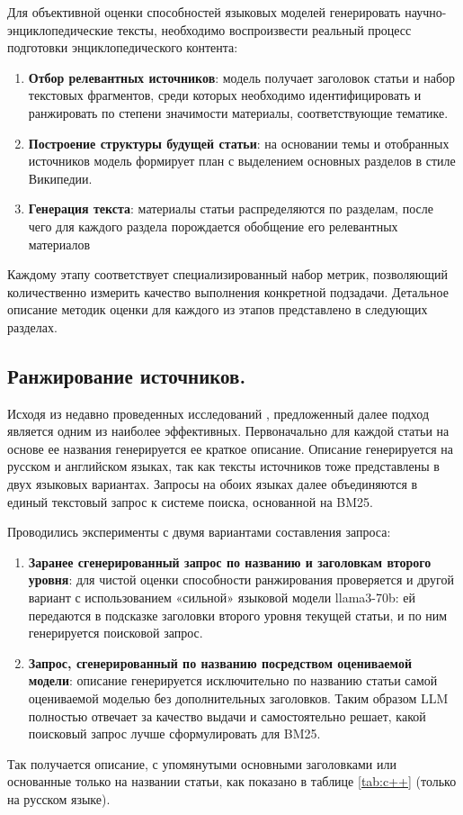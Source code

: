 \documentclass{article}
\theoremstyle{definition}
\theoremstyle{plain}
\begin{document}
Для объективной оценки способностей языковых моделей генерировать научно-энциклопедические тексты, необходимо воспроизвести реальный процесс подготовки энциклопедического контента:
\begin{enumerate}

    \item \textbf{Отбор релевантных источников}: модель получает заголовок статьи и набор текстовых фрагментов, среди которых необходимо идентифицировать и ранжировать по степени значимости материалы, соответствующие тематике. 
    
    \item \textbf{Построение структуры будущей статьи}: на основании темы и отобранных источников модель формирует план с выделением основных разделов в стиле Википедии.
    
    \item \textbf{Генерация текста}: материалы статьи распределяются по разделам, после чего для каждого раздела порождается обобщение его релевантных материалов

\end{enumerate}
Каждому этапу соответствует специализированный набор метрик, позволяющий количественно измерить качество выполнения конкретной подзадачи. 
Детальное описание методик оценки для каждого из этапов представлено в следующих разделах.
\subsection*{Ранжирование источников.}
Исходя из недавно проведенных исследований \cite{rerank}, предложенный далее подход является одним из наиболее эффективных.
Первоначально для каждой статьи на основе ее названия генерируется ее краткое описание. 
Описание генерируется на русском и английском языках, так как тексты источников тоже представлены в двух языковых вариантах. 
Запросы на обоих языках далее объединяются в единый текстовый запрос к системе поиска, основанной на BM25. 

Проводились эксперименты с двумя вариантами составления запроса:
\begin{enumerate}

    \item \textbf{Заранее сгенерированный запрос по названию и заголовкам второго уровня}: для чистой оценки способности ранжирования проверяется и другой вариант с использованием «сильной» языковой модели llama3-70b: 
    ей передаются в подсказке заголовки второго уровня текущей статьи, и по ним генерируется поисковой запрос.  
    
    \item \textbf{Запрос, сгенерированный по названию посредством оцениваемой модели}: описание генерируется исключительно по названию статьи самой оцениваемой моделью без дополнительных заголовков.
    Таким образом LLM полностью отвечает за качество выдачи и самостоятельно решает, какой поисковый запрос лучше сформулировать для BM25.

\end{enumerate}
Так получается описание, с упомянутыми основными заголовками или основанные только на названии статьи, как показано в таблице \ref{tab:c++} (только на русском языке).
\end{document}
